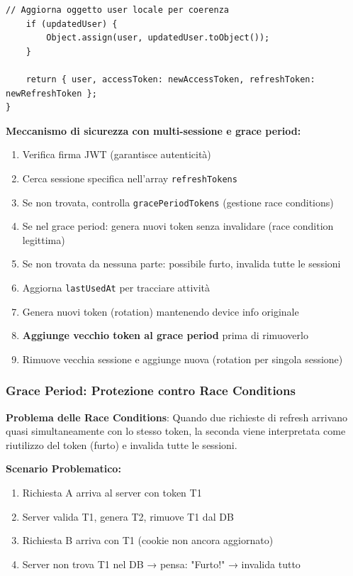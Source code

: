 \documentclass[11pt,a4paper]{article}
\newcommand{\code}[1]{\texttt{#1}}
\newcommand{\important}[1]{\textcolor{red!80!black}{\textbf{#1}}}
\begin{document}
\begin{lstlisting}[caption=Refresh Token con Validazione Multi-Sessione e Grace Period]
    // Aggiorna oggetto user locale per coerenza
    if (updatedUser) {
        Object.assign(user, updatedUser.toObject());
    }

    return { user, accessToken: newAccessToken, refreshToken: newRefreshToken };
}
\end{lstlisting}

\textbf{Meccanismo di sicurezza con multi-sessione e grace period:}
\begin{enumerate}
    \item Verifica firma JWT (garantisce autenticità)
    \item Cerca sessione specifica nell'array \code{refreshTokens}
    \item Se non trovata, controlla \code{gracePeriodTokens} (gestione race conditions)
    \item Se nel grace period: genera nuovi token senza invalidare (race condition legittima)
    \item Se non trovata da nessuna parte: possibile furto, invalida tutte le sessioni
    \item Aggiorna \code{lastUsedAt} per tracciare attività
    \item Genera nuovi token (rotation) mantenendo device info originale
    \item \important{Aggiunge vecchio token al grace period} prima di rimuoverlo
    \item Rimuove vecchia sessione e aggiunge nuova (rotation per singola sessione)
\end{enumerate}

\subsubsection{Grace Period: Protezione contro Race Conditions}

\important{Problema delle Race Conditions}: Quando due richieste di refresh arrivano quasi simultaneamente con lo stesso token, la seconda viene interpretata come riutilizzo del token (furto) e invalida tutte le sessioni.

\textbf{Scenario Problematico:}
\begin{enumerate}
    \item Richiesta A arriva al server con token T1
    \item Server valida T1, genera T2, rimuove T1 dal DB
    \item Richiesta B arriva con T1 (cookie non ancora aggiornato)
    \item Server non trova T1 nel DB → pensa: "Furto!" → invalida tutto
\end{enumerate}
\end{document}

